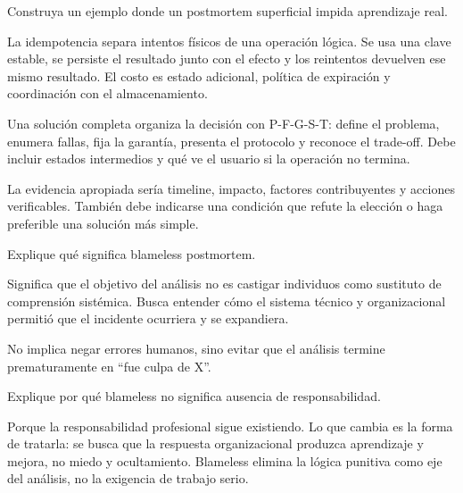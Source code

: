 \documentclass[variant=guia,cover=institutional,mode=screen]{ua-engineering-v6-article}
\begin{document}
\begin{uaexercise}
Construya un ejemplo donde un postmortem superficial impida aprendizaje real.
\end{uaexercise}
\begin{uaanswer}
La idempotencia separa intentos físicos de una operación lógica. Se usa una clave estable, se persiste el resultado junto con el efecto y los reintentos devuelven ese mismo resultado. El costo es estado adicional, política de expiración y coordinación con el almacenamiento.

Una solución completa organiza la decisión con P-F-G-S-T: define el problema, enumera fallas, fija la garantía, presenta el protocolo y reconoce el trade-off. Debe incluir estados intermedios y qué ve el usuario si la operación no termina.

La evidencia apropiada sería timeline, impacto, factores contribuyentes y acciones verificables. También debe indicarse una condición que refute la elección o haga preferible una solución más simple.
\end{uaanswer}

\begin{uaexercise}
Explique qué significa blameless postmortem.
\end{uaexercise}
\begin{uaanswer}
Significa que el objetivo del análisis no es castigar individuos como sustituto de comprensión sistémica. Busca entender cómo el sistema técnico y organizacional permitió que el incidente ocurriera y se expandiera.

No implica negar errores humanos, sino evitar que el análisis termine prematuramente en “fue culpa de X”.
\end{uaanswer}

\begin{uaexercise}
Explique por qué blameless no significa ausencia de responsabilidad.
\end{uaexercise}
\begin{uaanswer}
Porque la responsabilidad profesional sigue existiendo. Lo que cambia es la forma de tratarla: se busca que la respuesta organizacional produzca aprendizaje y mejora, no miedo y ocultamiento. Blameless elimina la lógica punitiva como eje del análisis, no la exigencia de trabajo serio.
\end{uaanswer}
\end{document}
